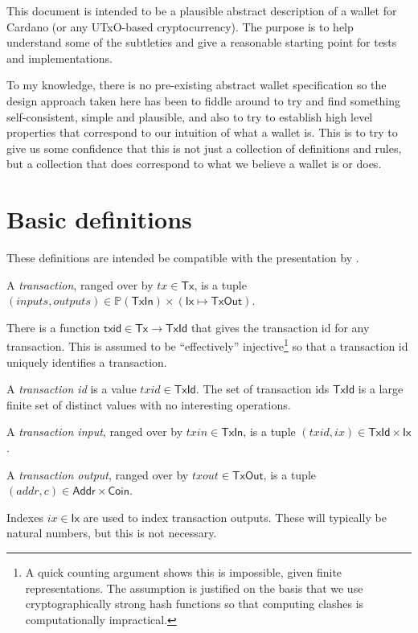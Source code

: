 \documentclass{article}
\newcommand{\powerset}[1]{\mathbb{P}(#1)}
\begin{document}
This document is intended to be a plausible abstract description of a wallet
for Cardano (or any UTxO-based cryptocurrency). The purpose is to help
understand some of the subtleties and give a reasonable starting point for
tests and implementations.

To my knowledge, there is no pre-existing abstract wallet specification so the
design approach taken here has been to fiddle around to try and find something
self-consistent, simple and plausible, and also to try to establish high level
properties that correspond to our intuition of what a wallet is. This is to try
to give us some confidence that this is not just a collection of definitions
and rules, but a collection that does correspond to what we believe a wallet is
or does.

\section{Basic definitions}

These definitions are intended be compatible with the presentation by
\cite{utxo_accounting}.

A \emph{transaction}, ranged over by $tx \in \mathsf{Tx}$, is a tuple
$(inputs, outputs)
   \in \powerset{\mathsf{TxIn}}
   \times (\mathsf{Ix} \mapsto \mathsf{TxOut})$.

There is a function $\mathsf{txid} \in \mathsf{Tx} \to \mathsf{TxId}$ that gives
the transaction id for any transaction. This is assumed to be ``effectively''
injective\footnote{A quick counting argument shows this is impossible, given
finite representations. The assumption is justified on the basis that we use
cryptographically strong hash functions so that computing clashes is
computationally impractical.} so that a transaction id uniquely identifies a
transaction.

A \emph{transaction id} is a value $txid \in \mathsf{TxId}$. The set of
transaction ids $\mathsf{TxId}$ is a large finite set of distinct values with
no interesting operations.

A \emph{transaction input}, ranged over by $txin \in \mathsf{TxIn}$, is a tuple
$(txid, ix) \in \mathsf{TxId} \times \mathsf{Ix}$.

A \emph{transaction output}, ranged over by $txout \in \mathsf{TxOut}$, is a tuple
$(addr, c) \in \mathsf{Addr} \times \mathsf{Coin}$.

Indexes $ix \in \mathsf{Ix}$ are used to index transaction outputs. These will
typically be natural numbers, but this is not necessary.
\end{document}
